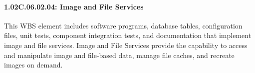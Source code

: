 \paragraph*{1.02C.06.02.04: Image and File Services}

This WBS element includes software programs, database tables, configuration files, unit tests, component integration tests, and documentation that implement image and file services. Image and File Services provide the capability to access and manipulate image and file-based data, manage file caches, and recreate images on demand.
